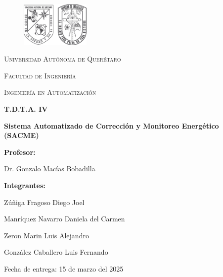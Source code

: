 \documentclass{report}          %
\newcommand{\fullname}      {Sistema Automatizado de Corrección y Monitoreo Energético (SACME)}
\newcommand{\docdate}       {15 de marzo del 2025}
\begin{document}
    \begin{titlepage}
        \centering
        \begin{figure}[ht]
            \centering
            \includegraphics[width=0.3\textwidth]{Recursos/Imagenes/Portada/logos_fi_uaq.png}
        \end{figure}
        
        \vspace{1cm}
        {\scshape\LARGE Universidad Autónoma de Querétaro \par}
        \vspace{0.5cm}
        {\scshape\Large Facultad de Ingeniería \par}
        \vspace{0.5cm}
        {\scshape\Large Ingeniería en Automatización \par}
        
        \vspace{1.5cm}
        {\Large\bfseries T.D.T.A. IV \par}
        
        \vspace{1cm}
        {\Large\bfseries \fullname \par}
        
        \vspace{1.5cm}
        {\large \textbf{Profesor:} \par}
        {\large Dr. Gonzalo Macías Bobadilla \par}
        
        \vspace{1.5cm}
        {\large \textbf{Integrantes:} \par}
        \begin{center}
            \large
            Zúñiga Fragoso Diego Joel\par
            \vspace{0.4cm}
            Manríquez Navarro Daniela del Carmen\par
            \vspace{0.4cm}
            Zeron Marin Luis Alejandro\par
            \vspace{0.4cm}
            González Caballero Luis Fernando\par
        \end{center}
        
        \vfill      %

        {\large Fecha de entrega: \docdate \par}
    \end{titlepage}
\end{document}
